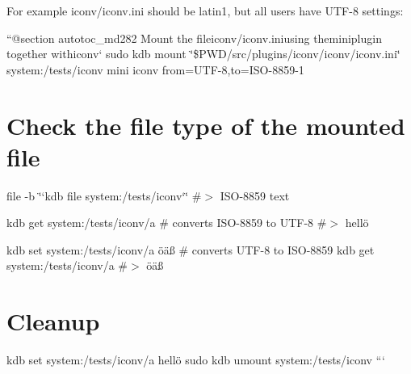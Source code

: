 For example {\ttfamily iconv/iconv.\+ini} should be {\ttfamily latin1}, but all users have {\ttfamily U\+T\+F-\/8} settings\+:

``{\ttfamily  @section autotoc\+\_\+md282 Mount the file}iconv/iconv.\+ini{\ttfamily using the}mini{\ttfamily plugin together with}iconv` sudo kdb mount \char`\"{}\$\+P\+W\+D/src/plugins/iconv/iconv/iconv.\+ini\char`\"{} system\+:/tests/iconv mini iconv from=U\+T\+F-\/8,to=I\+S\+O-\/8859-\/1\hypertarget{autotoc_md279_autotoc_md283}{}\section{Check the file type of the mounted file}\label{autotoc_md279_autotoc_md283}
file -\/b \char`\"{}`kdb file system\+:/tests/iconv`\char`\"{} \#$>$ I\+S\+O-\/8859 text

kdb get system\+:/tests/iconv/a \# converts I\+S\+O-\/8859 to U\+T\+F-\/8 \#$>$ hellö

kdb set system\+:/tests/iconv/a öäß \# converts U\+T\+F-\/8 to I\+S\+O-\/8859 kdb get system\+:/tests/iconv/a \#$>$ öäß\hypertarget{autotoc_md279_autotoc_md284}{}\section{Cleanup}\label{autotoc_md279_autotoc_md284}
kdb set system\+:/tests/iconv/a hellö sudo kdb umount system\+:/tests/iconv ``` 